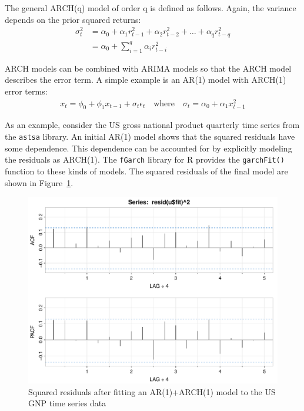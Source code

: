 \begin{samepage}
The general ARCH(q) model of order q is defined as follows. Again, the variance depends on the prior squared returns:
\begin{align*}
\sigma_t^2 &= \alpha_0 + \alpha_1 r_{t-1}^2 + \alpha_2 r_{t-2}^2 + \ldots + \alpha_q r_{t-q}^2 \\
           &= \alpha_0 + \sum_{i=1}^q \alpha_i r_{t-i}^2
\end{align*}
\end{samepage}

ARCH models can be combined with ARIMA models so that the ARCH model describes the error term. A simple example is an AR(1) model with ARCH(1) error terms:
\begin{align*}
x_t = \phi_0 + \phi_1 x_{t-1} + \sigma_t \epsilon_t \quad \text{where} \quad \sigma_t = \alpha_0 + \alpha_1 x_{t-1}^2
\end{align*} 

As an example, consider the US gross national product quarterly time series from the \texttt{astsa} library. An initial AR(1) model shows that the squared residuals have some dependence. This dependence can be accounted for by explicitly modeling the residuals as ARCH(1). The \texttt{fGarch} library for R provides the \texttt{garchFit()} function to these kinds of models. The squared residuals of the final model are shown in Figure~\ref{fig:figure35}.

\begin{figure}
\centering
\centering
\includegraphics[width=.75\textwidth]{figure35.pdf}
\caption[Squared residuals after fitting an AR(1)+ARCH(1) model]{Squared residuals after fitting an AR(1)+ARCH(1) model to the US GNP time series data}
\label{fig:figure35}
\end{figure}

